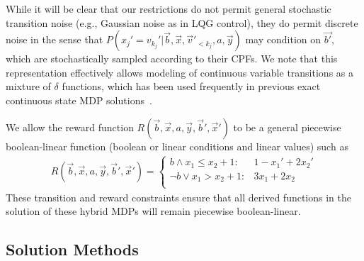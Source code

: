 While it will be clear
that our restrictions do not permit general stochastic transition
noise (e.g., Gaussian noise as in LQG control), they do permit
discrete noise in the sense that
$P(x_j'=v_{k_j}'|\vec{b},\vec{x},\vec{v}'_{<{k_j}},a,\vec{y})$ may condition on
$\vec{b'}$, which are stochastically sampled according to their CPFs.
We note that this representation effectively allows modeling of
continuous variable transitions as a mixture of $\delta$ functions,
which has been used frequently in previous exact continuous state MDP
solutions~\cite{feng04,hao09}.


We allow the reward function $R(\vec{b},\vec{x},a,\vec{y},\vec{b}',\vec{x}')$ to be
a general piecewise boolean-linear function (boolean or linear conditions
and linear values) such as
\begin{align}
R(\vec{b},\vec{x},a,\vec{y},\vec{b}',\vec{x}') = \begin{cases}
b \land x_1 \leq x_2 + 1 : & 1 - x_1' + 2x_2' \\
\neg b \lor x_1 > x_2 + 1:     & 3x_1 + 2x_2 \\
\end{cases} \label{eq:linear_reward}
\end{align}
These transition and reward constraints ensure that all derived
functions in the solution of these hybrid MDPs will remain piecewise boolean-linear.




\subsection{Solution Methods}

